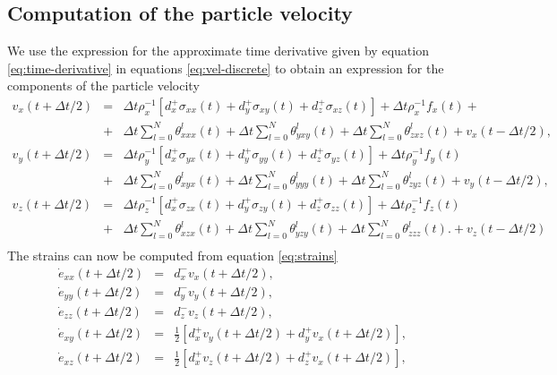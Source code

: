 \documentclass[11pt]{article}
\begin{document}
{\subsection*{Computation of the particle velocity}
We use the expression for the approximate time derivative given by equation \eqref{eq:time-derivative}
in equations \eqref{eq:vel-discrete} to obtain an expression for the components of the particle velocity
\begin{eqnarray}
v_x(t+\Delta t/2) & = & \Delta t\rho_x^{-1}\left[d^+_x \sigma_{xx}(t) +d^+_y \sigma_{xy}(t) +d^+_z \sigma_{xz}(t)\right] 
                         + \Delta t \rho_x^{-1}f_x(t) +\nonumber\\ 
           & + & \Delta t \sum_{l=0}^N\theta^l_{xxx}(t) +  \Delta t \sum_{l=0}^N\theta^l_{yxy}(t) +  \Delta t \sum_{l=0}^N\theta^l_{zxz}(t)
                   +v_x(t-\Delta t/2),\nonumber\\
v_y(t+\Delta t/2) & = & \Delta t\rho_y^{-1}\left[d^+_x \sigma_{yx}(t) +d^+_y \sigma_{yy}(t) +d^+_z \sigma_{yz}(t)\right] 
                         + \Delta t \rho_y^{-1}f_y(t)\nonumber\\
           & + & \Delta t\sum_{l=0}^N\theta^l_{xyx}(t) +  \Delta t\sum_{l=0}^N\theta^l_{yyy}(t) +  \Delta t\sum_{l=0}^N\theta^l_{zyz}(t)
                        + v_y(t-\Delta t/2), \nonumber\\ 
v_z(t+\Delta t/2) & = & \Delta t \rho_z^{-1}\left[d^+_x \sigma_{zx}(t) +d^+_y \sigma_{zy}(t) +d^+_z \sigma_{zz}(t)\right] 
                        + \Delta t \rho_z^{-1}f_z(t)\nonumber\\  
           & + & \Delta t\sum_{l=0}^N\theta^l_{xzx}(t) +  \Delta t\sum_{l=0}^N\theta^l_{yzy}(t) +  \Delta t\sum_{l=0}^N\theta^l_{zzz}(t)\nonumber.
                       +v_z(t-\Delta t/2) \\  
\end{eqnarray}
The strains can now be computed from equation \eqref{eq:strains}
\begin{eqnarray}
    \dot{e}_{xx}(t+\Delta t/2) & = & d^-_x v_x(t+\Delta t/2), \nonumber\\
    \dot{e}_{yy}(t+\Delta t/2) & = & d^-_y v_y(t+\Delta t/2), \nonumber\\
    \dot{e}_{zz}(t+\Delta t/2) & = & d^-_z v_z(t+\Delta t/2), \nonumber\\
    \dot{e}_{xy}(t+\Delta t/2) & = & \frac{1}{2}\left[d^+_x v_y(t+\Delta t/2) + d^+_y v_x(t+\Delta t/2)\right],\nonumber \\
    \dot{e}_{xz}(t+\Delta t/2) & = & \frac{1}{2}\left[d^+_x v_z(t+\Delta t/2) + d^+_z v_x(t+\Delta t/2)\right],\nonumber \\

\end{eqnarray}}
\end{document}
